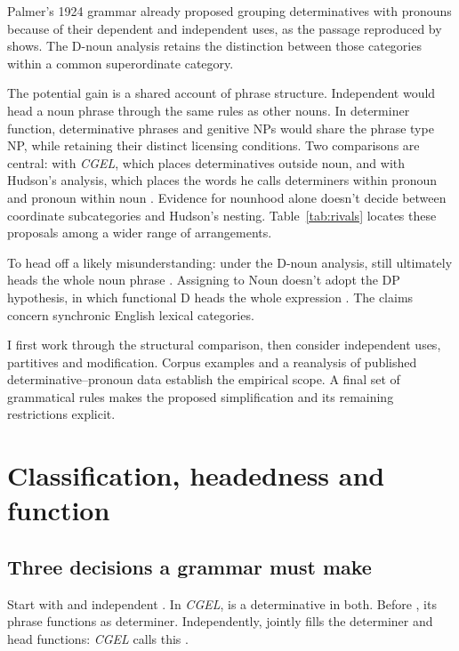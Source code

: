 \documentclass[12pt]{article}
\begin{document}
Palmer's 1924 grammar already proposed grouping determinatives with pronouns because of their dependent and independent uses, as the passage reproduced by \textcite[3]{reynolds2013determiners} shows. The D-noun analysis retains the distinction between those categories within a common superordinate category.

The potential gain is a shared account of phrase structure. Independent  would head a noun phrase through the same rules as other nouns. In determiner function, determinative phrases and genitive NPs would share the phrase type NP, while retaining their distinct licensing conditions. Two comparisons are central: with \textit{CGEL}, which places determinatives outside noun, and with Hudson's analysis, which places the words he calls determiners within pronoun and pronoun within noun \citep{hudson2004determiners,hudson2010wordgrammar}. Evidence for nounhood alone doesn't decide between coordinate subcategories and Hudson's nesting. Table~\ref{tab:rivals} locates these proposals among a wider range of arrangements.

To head off a likely misunderstanding: under the D-noun analysis,  still ultimately heads the whole noun phrase . Assigning  to Noun doesn't adopt the DP hypothesis, in which functional D heads the whole expression \citep{abney1987}. The claims concern synchronic English lexical categories.

I first work through the structural comparison, then consider independent uses, partitives and modification. Corpus examples and a reanalysis of published determinative--pronoun data establish the empirical scope. A final set of grammatical rules makes the proposed simplification and its remaining restrictions explicit.

\section{Classification, headedness and function}\label{sec:alternatives}

\subsection{Three decisions a grammar must make}

Start with  and independent . In \textit{CGEL},  is a determinative in both. Before , its phrase functions as determiner. Independently,  jointly fills the determiner and head functions: \textit{CGEL} calls this  \citep[410--412]{huddleston2002}.
\end{document}
